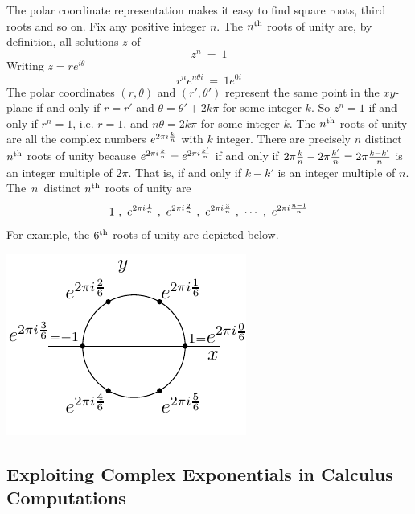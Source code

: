 The polar coordinate representation makes it easy to find square roots,
third roots and so on. Fix any positive integer $n$. The $n^{\rm th}$ roots
of unity are, by definition, all solutions $z$ of
\begin{equation*}
z^n\ =\ 1
\end{equation*}
Writing $z=re^{i\theta}$
\begin{equation*}
r^ne^{n\theta i}\ =\ 1e^{0i}
\end{equation*}
The polar coordinates $(r,\theta)$ and $(r',\theta')$ represent the same point
in the $xy$-plane if and only if $r=r'$ and $\theta=\theta'+2k\pi$ for some
integer $k$. So $z^n=1$ if and only if $r^n=1$, i.e. $r=1$, and 
$n\theta =2 k\pi$ for some integer $k$. The $n^{\rm th}$ roots of unity are 
all the complex numbers $e^{2\pi i{k\over n}}$ with $k$ integer. There are 
precisely $n$ distinct $n^{\rm th}$ roots of unity because 
$e^{2\pi i{k\over n}}=e^{2\pi i{k'\over n}}$ if and only if 
$2\pi {k\over n}-2\pi {k'\over n}=2\pi {k-k'\over n}$ is
an integer multiple of $2\pi$. That is, if and only if $k-k'$ is an integer
multiple of $n$. The $\, n\, $ distinct $n^{\rm th}$ roots of unity are
\begin{equation*}
1\ ,\ e^{2\pi i{1\over n}}\ ,\ e^{2\pi i{2\over n}}
\ ,\  e^{2\pi i{3\over n}}\ ,\ \cdots\ ,\ e^{2\pi i{n-1\over n}}
\end{equation*}
For example, the $6^{\rm th}$ roots of unity are depicted below.
\begin{efig}
\begin{center}
   \includegraphics{polar3}
\end{center}
\end{efig}


\subsection{Exploiting Complex Exponentials in Calculus Computations}
       \label{ssec complex calculus}

